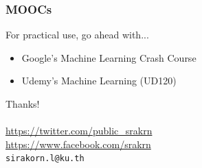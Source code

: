 \documentclass[aspectratio=169]{beamer}
\begin{document}
\begin{frame}
	\frametitle{MOOCs}
	For practical use, go ahead with...
	\begin{itemize}
		\item Google's Machine Learning Crash Course
		\item Udemy's Machine Learning (UD120)
	\end{itemize}
\end{frame}

\begin{frame}
	\begin{center}
		{\Huge Thanks!}
		\\~\\
		\url{https://twitter.com/public_srakrn}\\
		\url{https://www.facebook.com/srakrn}\\
		\texttt{sirakorn.l@ku.th}
	\end{center}
\end{frame}
\end{document}

